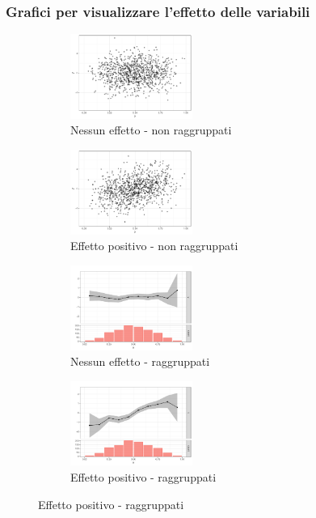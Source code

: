 \documentclass[pdf, aspectratio=169]{beamer}\usepackage[]{graphicx}\usepackage[]{color}
\theoremstyle{definition}
\begin{document}
\begin{frame}
\frametitle{Grafici per visualizzare l'effetto delle variabili}

\fontsize{9pt}{11pt}\selectfont

\begin{figure}
  \centering
  \begin{subfigure}[b]{4.8cm}
    \centering
    \caption{Nessun effetto - non raggruppati}
    \includegraphics[width=4cm]{_bookdown_files/_main_files/figure-latex/var-selection-1.pdf}
  \end{subfigure}
  \qquad
  \begin{subfigure}[b]{4.8cm}
    \centering
    \caption{Effetto positivo - non raggruppati}
    \includegraphics[width=4cm]{_bookdown_files/_main_files/figure-latex/var-selection-2.pdf}
  \end{subfigure}
  \par\medskip
  \begin{subfigure}[b]{4.8cm}
    \centering
    \caption{Nessun effetto - raggruppati}
    \includegraphics[width=4cm]{_bookdown_files/_main_files/figure-latex/var-selection-3.pdf}
  \end{subfigure}
  \qquad
  \begin{subfigure}[b]{4.8cm}
    \centering
    \caption{Effetto positivo - raggruppati}
    \includegraphics[width=4cm]{_bookdown_files/_main_files/figure-latex/var-selection-4.pdf}
  \end{subfigure}
\end{figure}

\end{frame}
\end{document}
